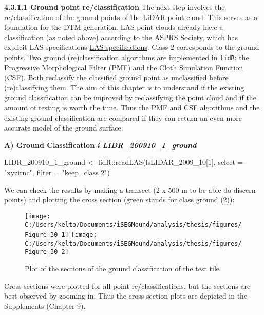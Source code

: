 \documentclass[
  12pt,
]{article}
\newenvironment{Shaded}{\begin{snugshade}}{\end{snugshade}}
\newcommand{\AttributeTok}[1]{\textcolor[rgb]{0.77,0.63,0.00}{#1}}
\newcommand{\DecValTok}[1]{\textcolor[rgb]{0.00,0.00,0.81}{#1}}
\newcommand{\FunctionTok}[1]{\textcolor[rgb]{0.00,0.00,0.00}{#1}}
\newcommand{\NormalTok}[1]{#1}
\newcommand{\OtherTok}[1]{\textcolor[rgb]{0.56,0.35,0.01}{#1}}
\newcommand{\SpecialCharTok}[1]{\textcolor[rgb]{0.00,0.00,0.00}{#1}}
\newcommand{\StringTok}[1]{\textcolor[rgb]{0.31,0.60,0.02}{#1}}
\begin{document}
\textbf{4.3.1.1 Ground point re/classification}
\newline
The next step involves the re/classification of the ground points of the LiDAR point cloud. This serves as a foundation for the DTM generation.
LAS point clouds already have a classification (as noted above) according to the ASPRS Society, which has explicit LAS specifications \href{https://www.asprs.org/wp-content/uploads/2010/12/LAS_1_4_r13.pdf}{LAS specifications}. Class 2 corresponds to the ground points.
Two ground (re)classification algorithms are implemented in \texttt{lidR}: the Progressive Morphological Filter (PMF) and the Cloth Simulation Function (CSF). Both reclassify the classified ground point as unclassified before (re)classifying them.
The aim of this chapter is to understand if the existing ground classification can be improved by reclassifying the point cloud and if the amount of testing is worth the time. Thus the PMF and CSF algorithms and the existing ground classification are compared if they can return an even more accurate model of the ground surface.

\textbf{A) Ground Classification}
\newline
\textbf{\emph{i LIDR\_200910\_1\_ground}}

\begin{Shaded}
\begin{Highlighting}[]
\NormalTok{LIDR\_200910\_1\_ground }\OtherTok{\textless{}{-}}\NormalTok{ lidR}\SpecialCharTok{::}\FunctionTok{readLAS}\NormalTok{(lsLIDAR\_2009\_10[}\DecValTok{1}\NormalTok{], }\AttributeTok{select =} \StringTok{"xyzirnc"}\NormalTok{, }\AttributeTok{filter =} \StringTok{"keep\_class 2"}\NormalTok{)}
\end{Highlighting}
\end{Shaded}

We can check the results by making a transect (2 x 500 m to be able do discern points) and plotting the cross section (green stands for class ground (2)):

\begin{figure}
\texttt{[image: C:/Users/kelto/Documents/iSEGMound/analysis/thesis/figures/Figure\_30\_1]} \texttt{[image: C:/Users/kelto/Documents/iSEGMound/analysis/thesis/figures/Figure\_30\_2]} \caption{Plot of the sections of the ground classification of the test tile.}\label{fig:Figure30}
\end{figure}

Cross sections were plotted for all point re/classifications, but the sections are best observed by zooming in. Thus the cross section plots are depicted in the Supplements (Chapter 9).
\end{document}
